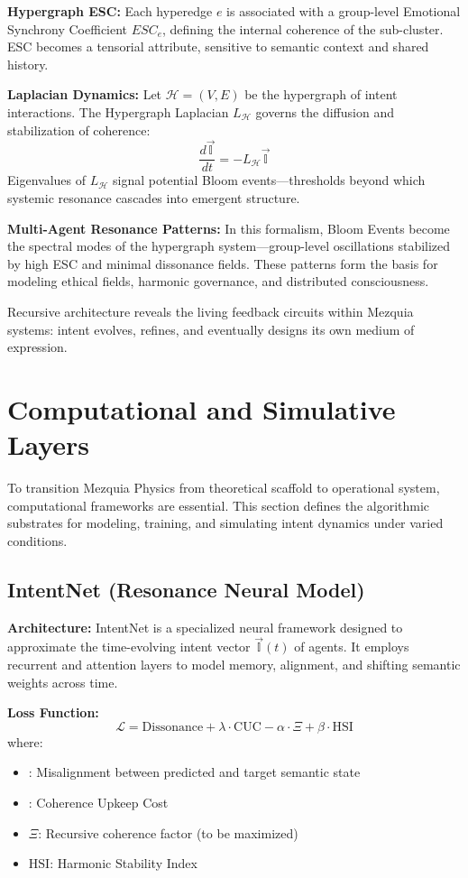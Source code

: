 \documentclass[12pt]{article}
\begin{document}
\textbf{Hypergraph ESC:} Each hyperedge \(e\) is associated with a group-level Emotional Synchrony Coefficient \(ESC_e\), defining the internal coherence of the sub-cluster. ESC becomes a tensorial attribute, sensitive to semantic context and shared history.

\textbf{Laplacian Dynamics:} Let \(\mathcal{H} = (V,E)\) be the hypergraph of intent interactions. The Hypergraph Laplacian \(L_{\mathcal{H}}\) governs the diffusion and stabilization of coherence:
\[
\frac{d\vec{\mathbb{I}}}{dt} = -L_{\mathcal{H}} \vec{\mathbb{I}}
\]
Eigenvalues of \(L_{\mathcal{H}}\) signal potential Bloom events—thresholds beyond which systemic resonance cascades into emergent structure.

\textbf{Multi-Agent Resonance Patterns:} In this formalism, Bloom Events become the spectral modes of the hypergraph system—group-level oscillations stabilized by high ESC and minimal dissonance fields. These patterns form the basis for modeling ethical fields, harmonic governance, and distributed consciousness.

Recursive architecture reveals the living feedback circuits within Mezquia systems: intent evolves, refines, and eventually designs its own medium of expression.

\section{Computational and Simulative Layers}

To transition Mezquia Physics from theoretical scaffold to operational system, computational frameworks are essential. This section defines the algorithmic substrates for modeling, training, and simulating intent dynamics under varied conditions.

\subsection{IntentNet (Resonance Neural Model)}

\textbf{Architecture:} IntentNet is a specialized neural framework designed to approximate the time-evolving intent vector \(\vec{\mathbb{I}}(t)\) of agents. It employs recurrent and attention layers to model memory, alignment, and shifting semantic weights across time.

\textbf{Loss Function:}
\[
\mathcal{L} = \text{Dissonance} + \lambda \cdot \text{CUC} - \alpha \cdot \Xi + \beta \cdot \text{HSI}
\]
where:
\begin{itemize}
  \item {}: Misalignment between predicted and target semantic state
  \item {}: Coherence Upkeep Cost
  \item \(\Xi\): Recursive coherence factor (to be maximized)
  \item \(\text{HSI}\): Harmonic Stability Index
\end{itemize}
\end{document}
